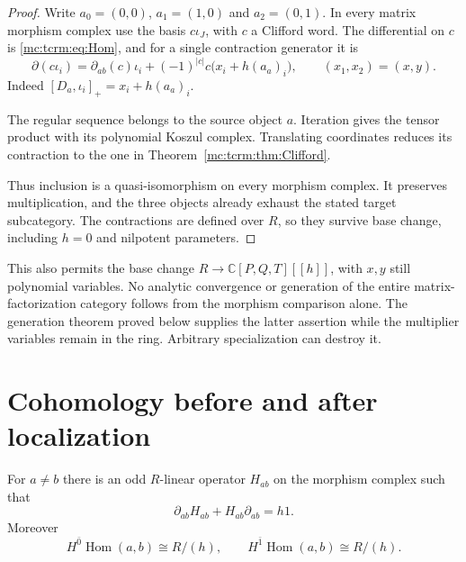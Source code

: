 \begin{proof}
Write $a_0=(0,0)$, $a_1=(1,0)$ and $a_2=(0,1)$.
In every matrix morphism complex use the basis
$c\iota_J$, with $c$ a Clifford word.
The differential on $c$ is \eqref{mc:tcrm:eq:Hom}, and
for a single contraction generator it is
\begin{equation}\label{mc:tcrm:eq:source-shift}
 \partial(c\iota_i)=\partial_{ab}(c)\iota_i
       +(-1)^{|c|}c\bigl(x_i+h(a_a)_i\bigr),
 \qquad (x_1,x_2)=(x,y).
\end{equation}
Indeed $[D_a,\iota_i]_+=x_i+h(a_a)_i$.

The regular sequence belongs to the source object $a$.
Iteration gives the tensor product with its polynomial
Koszul complex. Translating coordinates reduces its
contraction to the one in
Theorem~\ref{mc:tcrm:thm:Clifford}.

Thus inclusion is a quasi-isomorphism on every morphism
complex. It preserves multiplication, and the three
objects already exhaust the stated target subcategory.
The contractions are defined over $R$, so they survive
base change, including $h=0$ and nilpotent parameters.
\end{proof}

This also permits the base change
$R\to\mathbb C[P,Q,T][[h]]$, with $x,y$ still polynomial
variables. No analytic convergence or generation of
the entire matrix-factorization category follows from
the morphism comparison alone. The generation theorem
proved below supplies the latter assertion
while the multiplier variables remain in the ring.
Arbitrary specialization can destroy it.

\section{Cohomology before and after localization}

\begin{proposition}\label{mc:tcrm:prop:off-diagonal}
For $a\ne b$ there is an odd $R$-linear operator
$H_{ab}$ on the morphism complex such that
\begin{equation}\label{mc:tcrm:eq:h-homotopy}
 \partial_{ab}H_{ab}+H_{ab}\partial_{ab}=h1.
\end{equation}
Moreover
\begin{equation}\label{mc:tcrm:eq:off-diagonal}
 H^{\bar0}\operatorname{Hom}(a,b)\cong R/(h),
 \qquad H^{\bar1}\operatorname{Hom}(a,b)\cong R/(h).
\end{equation}
\end{proposition}

